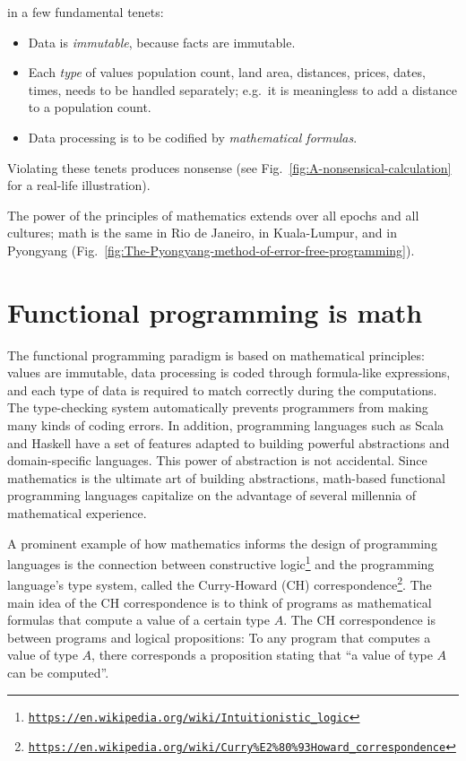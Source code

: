  in a few fundamental tenets:
\begin{itemize}
\item Data is \emph{immutable}, because facts are immutable. 
\item Each \emph{type} of values \textendash{} population count, land area,
distances, prices, dates, times, \textendash{} needs to be handled
separately; e.g.\ it is meaningless to add a distance to a population
count.
\item Data processing is to be codified by \emph{mathematical formulas}. 
\end{itemize}
Violating these tenets produces nonsense (see Fig.\ \ref{fig:A-nonsensical-calculation}
for a real-life illustration).

The power of the principles of mathematics extends over all epochs
and all cultures; math is the same in Rio de Janeiro, in Kuala-Lumpur,
and in Pyongyang (Fig.\ \ref{fig:The-Pyongyang-method-of-error-free-programming}).

\section{Functional programming is math}

The functional programming paradigm is based on mathematical principles:
values are immutable, data processing is coded through formula-like
expressions, and each type of data is required to match correctly
during the computations. The type-checking system automatically prevents
programmers from making many kinds of coding errors. In addition,
programming languages such as Scala and Haskell have a set of features
adapted to building powerful abstractions and domain-specific languages.
This power of abstraction is not accidental. Since mathematics is
the ultimate art of building abstractions, math-based functional programming
languages capitalize on the advantage of several millennia of mathematical
experience.

A prominent example of how mathematics informs the design of programming
languages is the connection between constructive logic\footnote{\texttt{\href{https://en.wikipedia.org/wiki/Intuitionistic_logic}{https://en.wikipedia.org/wiki/Intuitionistic\_logic}}}
and the programming language's type system, called the Curry-Howard
(CH) correspondence\footnote{\texttt{\href{https://en.wikipedia.org/wiki/Curry\%E2\%80\%93Howard_correspondence}{https://en.wikipedia.org/wiki/Curry\%E2\%80\%93Howard\_correspondence}}}.
The main idea of the CH correspondence
is to think of programs as mathematical formulas that compute a value
of a certain type $A$. The CH correspondence is between programs
and logical propositions: To any program that computes a value of
type $A$, there corresponds a proposition stating that ``a value
of type $A$ can be computed''.

